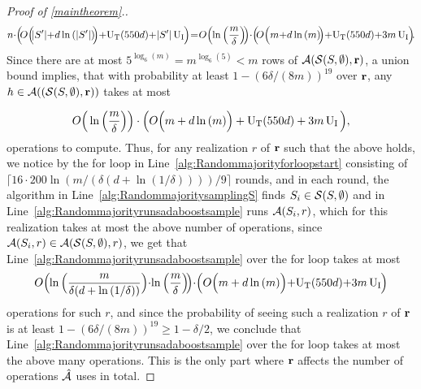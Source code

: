 \begin{proof}[Proof of \cref{maintheorem}.]
\begin{align*}
  n\negmedspace\cdot \negmedspace\Big(\negmedspace O\Big(\negmedspace |S'|\negmedspace +\negmedspace d\ln{\left(|S'| \right)}\negmedspace\Big)\negmedspace +\negmedspace\Utrain(550d)\negmedspace+\negmedspace |S'|\Uinf\negmedspace\Big)\negmedspace =\negmedspace O\Big(\negmedspace\ln{\Big(\frac{m}{\delta} \Big)}\negmedspace\Big)\negmedspace\cdot \negmedspace\Big(\negmedspace O\Big(m\negmedspace+\negmedspace d\ln{\left(m \right)}\negmedspace\Big)\negmedspace+\negmedspace\Utrain(550d)\negmedspace+\negmedspace 3m\Uinf\negmedspace\Big)\negmedspace.
\end{align*}
Since there are at most $5^{\log_{6}(m)}=m^{\log_{6}(5)}< m$ rows of $\mathcal{A}(\mathcal{S}(S,\emptyset),\mathbf{r})$, a union bound implies, that with probability at least $1-\left(6\delta/(8m)\right)^{19}$ over $\mathbf{r}$,  any $h\in\mathcal{A}((\mathcal{S}(S,\emptyset),\mathbf{r}))$ takes at most 

\begin{align*}
  O\Big(\ln{\Big(\frac{m}{\delta} \Big)}\Big)\cdot \Big(O\Big(m+d\ln{\left(m \right)}\Big)+\operatorname{U_{T}}(550d)+3m\operatorname{U_{I}}\Big),
  \end{align*}
operations to compute.
Thus, for any realization $r$ of $\mathbf{r}$ such that the above holds, we notice by the for loop in Line~\ref{alg:Randommajorityforloopstart} consisting of $\lceil 16\cdot200 \ln{(m/(\delta(d+\ln{(1/\delta )})))} /9\rceil$ rounds, and in each round, the algorithm in Line~\ref{alg:RandommajoritysamplingS} finds $S_i\in \mathcal{S}(S,\emptyset)$ and  
in Line~\ref{alg:Randommajorityrunsadaboostsample} runs $\mathcal{A}(S_{i},r)$, which for this realization takes at most the above number of 
operations, since $\mathcal{A}(S_{i},r)\in \mathcal{A}(\mathcal{S}(S,\emptyset),r)$, we get that Line~\ref{alg:Randommajorityrunsadaboostsample} over the for loop takes at most 
\begin{align}\label{eq:finalruntime}
  O\Big(\negmedspace\ln{\Big(\frac{m}{\delta\small(d+\ln{\left(1/\delta \right)}\small)} \Big)}\negmedspace\cdot\negmedspace  \ln{\Big(\frac{m}{\delta} \Big)} \negmedspace\Big)\negmedspace\cdot \negmedspace\Big(O\Big(m+d\ln{\left(m \right)}\Big)\negmedspace+\negmedspace\Utrain(550d)\negmedspace+\negmedspace 3m\Uinf\negmedspace\Big)
\end{align}
operations for such $r$, and since the probability of seeing such a realization $r$ of $ \mathbf{r} $ is at least $1-\left(6\delta/(8m)\right)^{19}\geq 1-\delta/2$, we conclude that Line~\ref{alg:Randommajorityrunsadaboostsample} over the for loop takes at most the above many operations. This is the only part where $\mathbf{r}$ affects the number of operations $\mathcal{\hat{A}}$ uses in total.
 

\end{proof}
